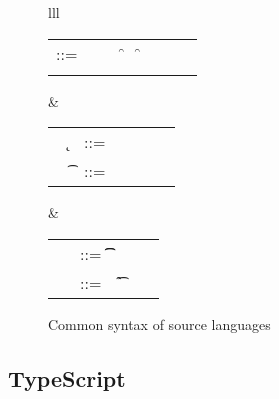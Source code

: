 \documentclass[acmlarge, anonymous, authordraft, review]{acmart} %
\begin{document}
\begin{figure}[!h]\hrulefill
\vspace{2mm}  \small


\begin{tabular}{lll}
\begin{minipage}{7cm}\begin{tabular}{@{}l@{~}l@{}l@{}l@{}l@{}l@{}l@{}l}
\e\hspace{.1cm} ::= & \hspace{.2cm} \x        
    &\B \this         
   &\B \FRead\f     
   &\B \FWrite\f\e   
   &\B \Call\e\m\e \\
   &
   &\B \that      
   &\B \New\C{\e[1]..}  
\end{tabular}\end{minipage}&
\begin{minipage}{4.4cm}\begin{tabular}{l@{~}l@{}l@{}ll}
   ~ \k &::= \Class \C {\fd[1]..}{\md[1]..} \\
~ \t&::= ~ \any  \B   \C  \B \src{\CW}  \\ 
\end{tabular}\end{minipage} &
\begin{minipage}{2.9cm}\begin{tabular}{l@{~}l@{}l@{}l}
\md &::= \Mdef\m\x\t\t\e \\
~\fd&::= ~ \Fdef\f\t \\ 
\end{tabular}\end{minipage}\end{tabular}

\vspace{2mm}\hrulefill
\caption{Common syntax of source languages}\label{f:sourcesyntax}
\end{figure}


\subsection{TypeScript}
\end{document}
